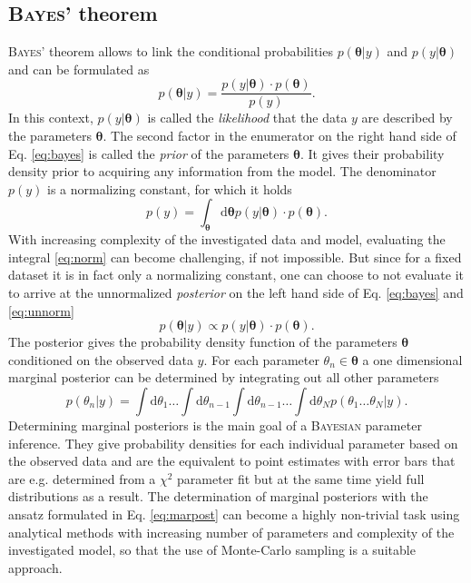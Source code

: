 \subsection{\textsc{Bayes}' theorem}
\textsc{Bayes'} theorem allows to link the conditional probabilities $p(\boldsymbol{\theta}|y)$ and $p(y|\boldsymbol{\theta})$ and can be formulated as \cite{bayes}
\begin{equation}
	p(\boldsymbol{\theta}|y)=\frac{p(y|\boldsymbol{\theta})\cdot p(\boldsymbol{\theta})}{p(y)}.
	\label{eq:bayes}
\end{equation}
In this context, $p(y|\boldsymbol{\theta})$ is called the \emph{likelihood} that the data $y$ are described by the parameters $\boldsymbol{\theta}$. The second factor in the enumerator on the right hand side of Eq. \eqref{eq:bayes} is called the \emph{prior} of the parameters $\boldsymbol{\theta}$. It gives their probability density prior to acquiring any information from the model. The denominator $p(y)$ is a normalizing constant, for which it holds
\begin{equation}
	p(y)=\int_{\boldsymbol{\theta}}\text{d}\boldsymbol{\theta}p(y|\boldsymbol{\theta})\cdot p(\boldsymbol{\theta}).
	\label{eq:norm}
\end{equation}
With increasing complexity of the investigated data and model, evaluating the integral \eqref{eq:norm} can become challenging, if not impossible. But since for a fixed dataset it is in fact only a normalizing constant, one can choose to not evaluate it to arrive at the unnormalized \emph{posterior} on the left hand side of Eq. \ref{eq:bayes} and \ref{eq:unnorm}
\begin{equation}
		p(\boldsymbol{\theta}|y)\propto p(y|\boldsymbol{\theta})\cdot p(\boldsymbol{\theta}).
		\label{eq:unnorm}
\end{equation}
The posterior gives the probability density function of the parameters $\boldsymbol{\theta}$ conditioned on the observed data $y$.  For each parameter $\theta_n\in\boldsymbol{\theta}$ a one dimensional marginal posterior can be determined by integrating out all other parameters \cite{sivia}
\begin{equation}
	\label{eq:marpost}
	p(\theta_n|y)=\int\text{d}\theta_1\dots\int\text{d}\theta_{n-1}\int\text{d}\theta_{n-1}\dots\int\text{d}\theta_Np(\theta_1\dots\theta_N|y).
\end{equation}
Determining marginal posteriors is the main goal of a \textsc{Bayesian} parameter inference. They give probability densities for each individual parameter based on the observed data and are the equivalent to point estimates with error bars that are e.g. determined from a $\chi^2$ parameter fit but at the same time yield full distributions as a result. The determination of marginal posteriors with the ansatz formulated in Eq. \ref{eq:marpost} can become a highly non-trivial task using analytical methods with increasing number of parameters and complexity of the investigated model, so that the use of Monte-Carlo sampling is a suitable approach.
